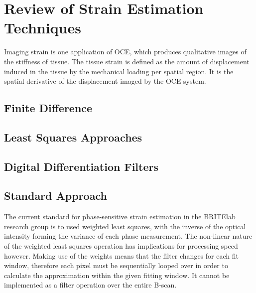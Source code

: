 \chapter{Review of Strain Estimation Techniques}

Imaging strain is one application of OCE, which produces qualitative images of the stiffness of tissue. The tissue strain is defined as the amount of displacement induced in the tissue by the mechanical loading per spatial region. It is the spatial derivative of the displacement imaged by the OCE system.

\section{Finite Difference}

\section{Least Squares Approaches}

\section{Digital Differentiation Filters}

\section{Standard Approach}
The current standard for phase-sensitive strain estimation in the BRITElab research group is to used weighted least squares, with the inverse of the optical intensity forming the variance of each phase measurement. The non-linear nature of the weighted least squares operation has implications for processing speed however. Making use of the weights means that the filter changes for each fit window, therefore each pixel must be sequentially looped over in order to calculate the approximation within the given fitting window. It cannot be implemented as a filter operation over the entire B-scan.

